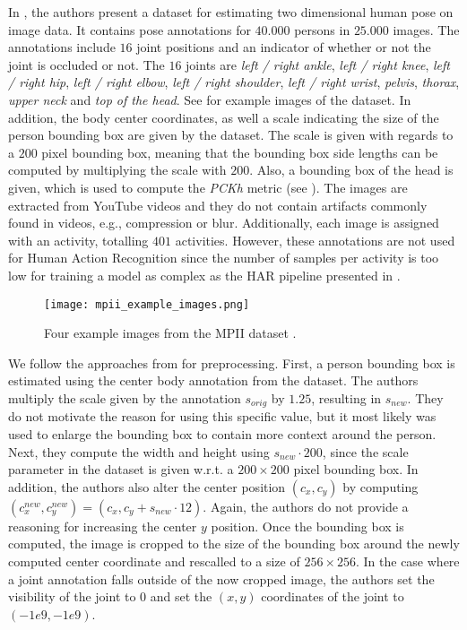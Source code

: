 In \cite{andriluka_2d_2014}, the authors present a dataset for estimating two dimensional human pose on image data.
It contains pose annotations for $40.000$ persons in $25.000$ images.
The annotations include $16$ joint positions and an indicator of whether or not the joint is occluded or not.
The $16$ joints are \textit{left / right ankle}, \textit{left / right knee}, \textit{left / right hip}, \textit{left / right elbow}, \textit{left / right shoulder}, \textit{left / right wrist}, \textit{pelvis}, \textit{thorax}, \textit{upper neck} and \textit{top of the head}.
See  for example images of the dataset.
In addition, the body center coordinates, as well a scale indicating the size of the person bounding box are given by the dataset.
The scale is given with regards to a $200$ pixel bounding box, meaning that the bounding box side lengths can be computed by multiplying the scale with $200$.
Also, a bounding box of the head is given, which is used to compute the \textit{PCKh} metric (see ).
The images are extracted from YouTube videos and they do not contain artifacts commonly found in videos, e.g., compression or blur.
Additionally, each image is assigned with an activity, totalling $401$ activities.
However, these annotations are not used for Human Action Recognition since the number of samples per activity is too low for training a model as complex as the HAR pipeline presented in .

\begin{figure}[htb!]
    \centering
    \texttt{[image: mpii\_example\_images.png]}
    \caption{Four example images from the MPII dataset \cite{andriluka_2d_2014}. }
    \label{fig:mpii_example_images}
\end{figure}

We follow the approaches from \cite{luvizon_2d/3d_2018} for preprocessing.
First, a person bounding box is estimated using the center body annotation from the dataset.
The authors multiply the scale given by the annotation $s_{orig}$ by $1.25$, resulting in $s_{new}$.
They do not motivate the reason for using this specific value, but it most likely was used to enlarge the bounding box to contain more context around the person.
Next, they compute the width and height using $s_{new} \cdot 200$, since the scale parameter in the dataset is given w.r.t. a $200 \times 200$ pixel bounding box.
In addition, the authors also alter the center position $(c_x,  c_y)$ by computing $(c_{x}^{new}, c_y^{new}) = (c_x, c_y + s_{new} \cdot 12)$.
Again, the authors do not provide a reasoning for increasing the center $y$ position.
Once the bounding box is computed, the image is cropped to the size of the bounding box around the newly computed center coordinate and rescalled to a size of $256 \times 256$.
In the case where a joint annotation falls outside of the now cropped image, the authors set the visibility of the joint to $0$ and set the $(x,y)$ coordinates of the joint to $(-1e9, -1e9)$.

